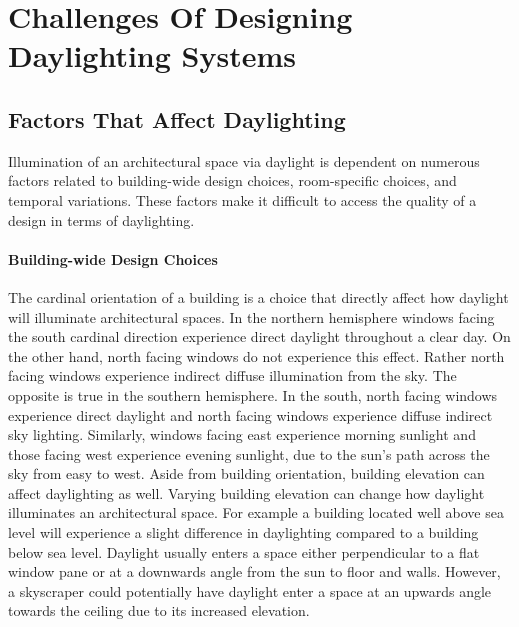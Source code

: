 \section{Challenges Of Designing Daylighting Systems}
  

  \subsection{Factors That Affect Daylighting}

    Illumination of an architectural space via daylight is dependent on numerous factors related to building-wide design choices, room-specific choices, and temporal variations.
    These factors make it difficult to access the quality of a design in terms of daylighting.\\

    \paragraph{Building-wide Design Choices} 
    The cardinal orientation of a building is a choice that directly affect how daylight will illuminate architectural spaces.
    In the northern hemisphere windows facing the south cardinal direction experience direct daylight throughout a clear day.
    On the other hand, north facing windows do not experience this effect.
    Rather north facing windows experience indirect diffuse illumination from the sky.
    The opposite is true in the southern hemisphere.
    In the south, north facing windows experience direct daylight and north facing windows experience diffuse indirect sky lighting.
    Similarly, windows facing east experience morning sunlight and those facing west experience evening sunlight, due to the sun's path across the sky from easy to west. \cite{Robbins}
    Aside from building orientation, building elevation can affect daylighting as well.
    Varying building elevation can change how daylight illuminates an architectural space.
    For example a building located well above sea level will experience a slight difference in daylighting compared to a building below sea level.
    Daylight usually enters a space either perpendicular to a flat window pane or at a downwards angle from the sun to floor and walls.
    However, a skyscraper could potentially have daylight enter a space at an upwards angle towards the ceiling due to its increased elevation.\\

